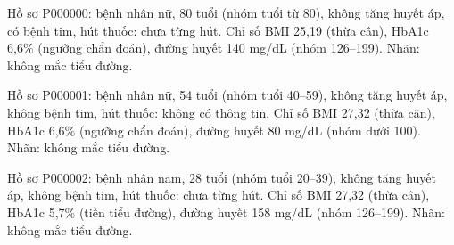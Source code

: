 Hồ sơ P000000: bệnh nhân nữ, 80 tuổi (nhóm tuổi từ 80), không tăng huyết áp, có bệnh tim, hút thuốc: chưa từng hút. Chỉ số BMI 25,19 (thừa cân), HbA1c 6,6\% (ngưỡng chẩn đoán), đường huyết 140 mg/dL (nhóm 126–199). Nhãn: không mắc tiểu đường.\par
Hồ sơ P000001: bệnh nhân nữ, 54 tuổi (nhóm tuổi 40–59), không tăng huyết áp, không bệnh tim, hút thuốc: không có thông tin. Chỉ số BMI 27,32 (thừa cân), HbA1c 6,6\% (ngưỡng chẩn đoán), đường huyết 80 mg/dL (nhóm dưới 100). Nhãn: không mắc tiểu đường.\par
Hồ sơ P000002: bệnh nhân nam, 28 tuổi (nhóm tuổi 20–39), không tăng huyết áp, không bệnh tim, hút thuốc: chưa từng hút. Chỉ số BMI 27,32 (thừa cân), HbA1c 5,7\% (tiền tiểu đường), đường huyết 158 mg/dL (nhóm 126–199). Nhãn: không mắc tiểu đường.\par
